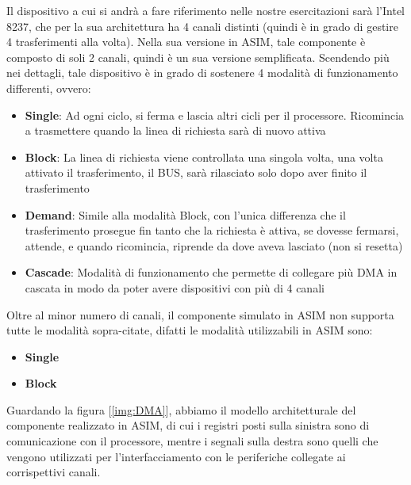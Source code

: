 Il dispositivo a cui si andrà a fare riferimento nelle nostre esercitazioni sarà l'Intel 8237, che per la sua architettura ha 4 canali distinti (quindi è in grado di gestire 4 trasferimenti alla volta). Nella sua versione in ASIM, tale componente è composto di soli 2 canali, quindi è un sua versione semplificata.
Scendendo più nei dettagli, tale dispositivo è in grado di sostenere 4 modalità di funzionamento differenti, ovvero:
\begin{itemize}
    \item \textbf{Single}: Ad ogni ciclo, si ferma e lascia altri cicli per il processore. Ricomincia a trasmettere quando la linea di richiesta sarà di nuovo attiva
    \item \textbf{Block}: La linea di richiesta viene controllata una singola volta, una volta attivato il trasferimento, il BUS, sarà rilasciato solo dopo aver finito il trasferimento
    \item \textbf{Demand}: Simile alla modalità Block, con l'unica differenza che il trasferimento prosegue fin tanto che la richiesta è attiva, se dovesse fermarsi, attende, e quando ricomincia, riprende da dove aveva lasciato (non si resetta)
    \item \textbf{Cascade}: Modalità di funzionamento che permette di collegare più DMA in cascata in modo da poter avere dispositivi con più di 4 canali
\end{itemize}

Oltre al minor numero di canali, il componente simulato in ASIM non supporta tutte le modalità sopra-citate, difatti le modalità utilizzabili in ASIM sono:
\begin{itemize}
    \item \textbf{Single}
    \item \textbf{Block}
\end{itemize}

Guardando la figura [\ref{img:DMA}], abbiamo il modello architetturale del componente realizzato in ASIM, di cui i registri posti sulla sinistra sono di comunicazione con il processore, mentre i segnali sulla destra sono quelli che vengono utilizzati per l'interfacciamento con le periferiche collegate ai corrispettivi canali.

